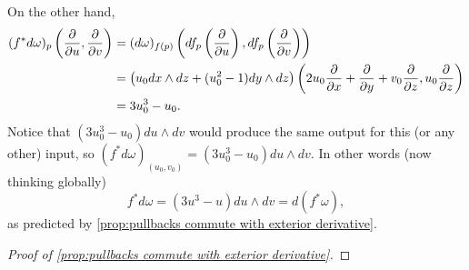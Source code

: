 \begin{example}
	On the other hand,
	\begin{align*}
		(f^\ast d\omega)_{p}\left(\frac{\partial}{\partial u}, \frac{\partial}{\partial v}\right) & = (d\omega)_{f(p)} \left(df_{p}\left(\frac{\partial}{\partial u}\right), df_p\left(\frac{\partial}{\partial v}\right)\right) \\
		 & = \left(\vphantom{x^2}u_0 dx \wedge dz + (u_0^2-1) dy \wedge dz\right)\left(2u_0 \frac{\partial}{\partial x} + \frac{\partial}{\partial y} + v_0\frac{\partial}{\partial z}, u_0\frac{\partial}{\partial z}\right) \\
		 & = 3u_0^3 -u_0.
	\end{align*}
	Notice that $(3u_0^3 -u_0)du \wedge dv $ would produce the same output for this (or any other) input, so $(f^\ast d\omega)_{(u_0,v_0)}= (3u_0^3 -u_0)du \wedge dv$. In other words (now thinking globally)
	\[
		f^\ast d\omega = (3u^3-u)du \wedge dv = d(f^\ast \omega),
	\]
	as predicted by \cref{prop:pullbacks commute with exterior derivative}.
\end{example}

\begin{proof}[Proof of \cref{prop:pullbacks commute with exterior derivative}]
	 
\end{proof}